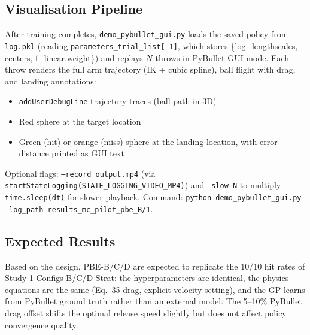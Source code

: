 \subsection{Visualisation Pipeline}
\label{sec:study3:viz}

After training completes, \texttt{demo\_pybullet\_gui.py} loads the saved policy
from \texttt{log.pkl} (reading \texttt{parameters\_trial\_list[-1]}, which stores
\{log\_lengthscales, centers, f\_linear.weight\}) and replays $N$ throws in
PyBullet GUI mode.
Each throw renders the full arm trajectory (IK + cubic spline), ball flight with
drag, and landing annotations:
\begin{itemize}
  \item \texttt{addUserDebugLine} trajectory traces (ball path in 3D)
  \item Red sphere at the target location
  \item Green (hit) or orange (miss) sphere at the landing location, with error
        distance printed as GUI text
\end{itemize}
Optional flags: \texttt{--record output.mp4} (via
\texttt{startStateLogging(STATE\_LOGGING\_VIDEO\_MP4)}) and
\texttt{--slow N} to multiply \texttt{time.sleep(dt)} for slower playback.
Command: \texttt{python demo\_pybullet\_gui.py --log\_path results\_mc\_pilot\_pbe\_B/1}.

\subsection{Expected Results}
\label{sec:study3:results}


Based on the design, PBE-B/C/D are expected to replicate the 10/10 hit rates of
Study 1 Configs B/C/D-Strat: the hyperparameters are identical, the physics
equations are the same (Eq.~35 drag, explicit velocity setting), and the GP learns
from PyBullet ground truth rather than an external model.
The 5--10\% PyBullet drag offset shifts the optimal release speed slightly but does
not affect policy convergence quality.
